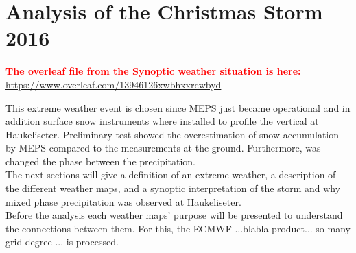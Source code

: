 \chapter{Analysis of the Christmas Storm 2016}
\textcolor{red}{\textbf{The overleaf file from the Synoptic weather situation is here:} \\
	\url{https://www.overleaf.com/13946126xwbhxxrcwbyd}}

This extreme weather event is chosen since MEPS just became operational and in addition surface snow instruments where installed to profile the vertical at Haukeliseter. Preliminary test showed the overestimation of snow accumulation by MEPS compared to the measurements at the ground. Furthermore, was changed the phase between the precipitation.  
\\
The next sections will give a definition of an extreme weather, a description of the different weather maps, and a synoptic interpretation of the storm and why mixed phase precipitation was observed at Haukeliseter. \\
Before the analysis each weather maps' purpose  will be presented to understand the connections between them. For this, the ECMWF ...blabla product... so many grid degree ...  is processed.
\\
